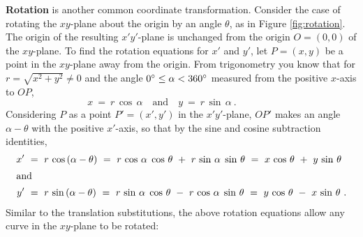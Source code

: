 \textbf{Rotation} is another common coordinate transformation. Consider the
case of rotating the $xy$-plane about the origin by an angle $\theta$, as in
Figure \ref{fig:rotation}. The origin of the resulting
$x'y'$-plane is unchanged from the origin $O=(0,0)$ of the $xy$-plane. To find
the rotation equations for $x'$ and $y'$, let $P=(x,y)$ be a point in the
$xy$-plane away from the origin. From trigonometry you know that for
$r=\sqrt{x^2+y^2} \ne 0$ and the angle $0^\circ \le \alpha < 360^\circ$
measured from the positive $x$-axis to $OP$,
\[
x ~=~ r\,\cos\,\alpha \quad\text{and}\quad y ~=~ r\,\sin\,\alpha ~.\qquad\qquad
\]
Considering $P$ as a point $P'=(x',y')$ in the $x'y'$-plane, $OP'$ makes an
angle $\alpha - \theta$ with the positive $x'$-axis, so that by the sine and
cosine subtraction identities,
\begin{align}
x' ~&=~ r\,\cos\,(\alpha - \theta) ~=~
        r\,\cos\,\alpha\;\cos\,\theta ~+~ r\,\sin\,\alpha\;\sin\,\theta ~=~
        x\,\cos\,\theta ~+~ y\,\sin\,\theta\label{eqn:xrotate}\\
\intertext{and}
y' ~&=~ r\,\sin\,(\alpha - \theta) ~=~
        r\,\sin\,\alpha\;\cos\,\theta ~-~ r\,\cos\,\alpha\;\sin\,\theta ~=~
        y\,\cos\,\theta ~-~ x\,\sin\,\theta\label{eqn:yrotate} ~.
\end{align}
Similar to the translation substitutions, the above rotation equations allow any
curve in the $xy$-plane to be rotated:

